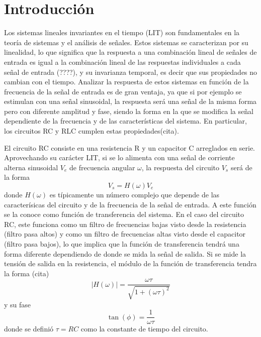 \section{Introducción}
    Los sistemas lineales invariantes en el tiempo (LIT) son fundamentales en la teoría de sistemas y el análisis de señales. Estos sistemas se caracterizan por su linealidad, lo que significa que la respuesta a una combinación lineal de señales de entrada es igual a la combinación lineal de las respuestas individuales a cada señal de entrada (????), y su invarianza temporal, es decir que sus propiedades no cambian con el tiempo. Analizar la respuesta de estos sistemas en función de la frecuencia de la señal de entrada es de gran ventaja, ya que si por ejemplo se estimulan con una señal sinusoidal, la respuesta será una señal de la misma forma pero con diferente amplitud y fase, siendo la forma en la que se modifica la señal dependiente de la frecuencia y de las características del sistema. En particular, los circuitos RC y RLC cumplen estas propiedades(cita).

    El circuito RC consiste en una resistencia R y un capacitor C arreglados en serie. Aprovechando su carácter LIT, si se lo alimenta con una señal de corriente alterna sinusoidal \(V_e\) de frecuencia angular \(\omega\), la respuesta del circuito \(V_s\) será de la forma
    \begin{equation}
        V_s = H(\omega) V_e
    \end{equation}
    donde \(H(\omega)\) es típicamente un número complejo que depende de las caracterísicas del circuito y de la frecuencia de la señal de entrada. A este función se la conoce como función de transferencia del sistema. En el caso del circuito RC, este funciona como un filtro de frecuencias bajas visto desde la resistencia (filtro pasa altos) y como un filtro de frecuencias altas visto desde el capacitor (filtro pasa bajos), lo que implica que la función de transferencia tendrá una forma diferente dependiendo de donde se mida la señal de salida. Si se mide la tensión de salida en la resistencia, el módulo de la función de transferencia tendra la forma (cita)
    \begin{equation}
        |H(\omega)| = \frac{\omega \tau}{\sqrt{1 + (\omega \tau)^2}} 
    \end{equation}
    y su fase 
    \begin{equation}
        \tan(\phi) = \frac{1}{\omega \tau}
    \end{equation}
    donde se definió \(\tau = RC\) como la constante de tiempo del circuito.

 